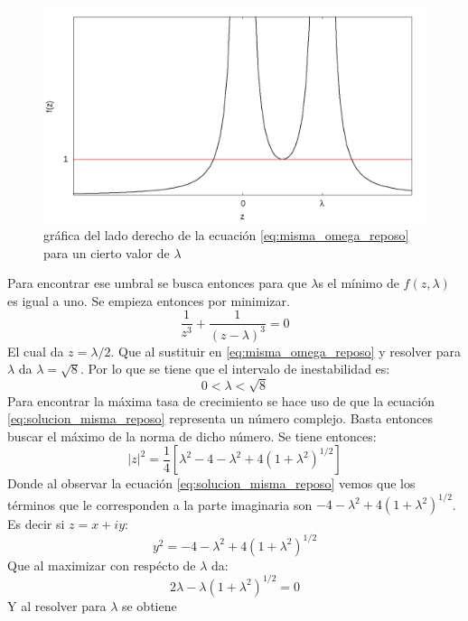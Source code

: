 \documentclass[12pt]{article}
\begin{document}
\begin{figure}
\includegraphics[height=0.3\paperheight]{f_z_reposo.png}
\caption{gráfica del lado derecho de la ecuación \ref{eq:misma_omega_reposo} para un cierto valor de $\lambda$}
\label{fig:fz_reposo}
\end{figure}
Para encontrar ese umbral se busca entonces para que $\lambda$s el mínimo de $f(z,\lambda)$ es igual a uno. Se empieza entonces por minimizar.
\begin{equation}
\frac{1}{z^3} + \frac{1}{(z-\lambda)^3}=0
\end{equation}
El cual da $z=\lambda / 2$. Que al sustituir en \ref{eq:misma_omega_reposo} y resolver para $\lambda$ da $\lambda = \sqrt{8}$. Por lo que se tiene que el intervalo de inestabilidad es:
\begin{equation}
0 < \lambda < \sqrt{8}
\end{equation}
Para encontrar la máxima tasa de crecimiento se hace uso de que la ecuación \ref{eq:solucion_misma_reposo} representa un número complejo. Basta entonces buscar el máximo de la norma de dicho número. Se tiene entonces:
\begin{equation}
|z|^2 = \frac{1}{4}[\lambda^2 -4 - \lambda^2 + 4(1 + \lambda^2)^{1/2}]
\end{equation}
Donde al observar la ecuación \ref{eq:solucion_misma_reposo} vemos que los términos que le corresponden a la parte imaginaria son $-4 - \lambda^2 + 4(1 + \lambda^2)^{1/2}$. Es decir si $z=x +iy$:
\begin{equation}
y^2= -4 - \lambda^2 + 4(1 + \lambda^2)^{1/2}
\end{equation}
Que al maximizar con respécto de $\lambda$ da:
\begin{equation}
2\lambda -\lambda(1 + \lambda^2)^{1/2} =0
\end{equation}
Y al resolver para $\lambda$ se obtiene
\end{document}
